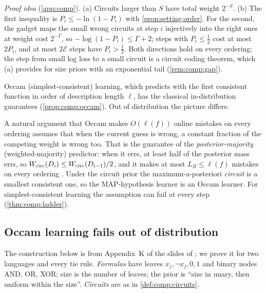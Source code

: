\emph{Proof idea} (\cref{app:comp}). (a) Circuits larger than $S$ have total weight $2^{-S}$. (b) The first inequality is $P_i\le-\ln(1-P_i)$ with \cref{prop:setting:order}. For the second, the gadget maps the small wrong circuits at step $i$ injectively into the right ones at weight cost $2^{-\Gamma}$, so $-\log(1-P_i)\le\Gamma+2$; steps with $P_i\le\frac12$ cost at most $2P_i$, and at most $2\mathcal E$ steps have $P_i>\frac12$. Both directions hold on every ordering; the step from small log loss to a small circuit is a circuit coding theorem, which (a) provides for size priors with an exponential tail (\cref{rem:comp:gap}).

Occam (simplest-consistent) learning, which predicts with the first consistent function in order of description length $\ell$, has the classical in-distribution guarantees (\cref{prop:comp:occam}). Out of distribution the picture differs:

\begin{remark}\label{rem:comp:majority}
A natural argument that Occam makes $O(\ell(f))$ online mistakes on every ordering assumes that when the current guess is wrong, a constant fraction of the competing weight is wrong too. That is the guarantee of the \emph{posterior-majority} (weighted-majority) predictor: when it errs, at least half of the posterior mass errs, so $W_{\mathrm{circ}}(D_i)\le W_{\mathrm{circ}}(D_{i-1})/2$, and it makes at most $L_B\le\ell(f)$ mistakes on every ordering \citep{littlestone1988learning,littlestone1994weighted}. Under the circuit prior the maximum-a-posteriori \emph{circuit} is a smallest consistent one, so the MAP-hypothesis learner is an Occam learner. For simplest-consistent learning the assumption can fail at every step (\cref{thm:comp:ladder}).
\end{remark}

\subsection{Occam learning fails out of distribution}\label{sec:comp:ladder}

The construction below is from Appendix~K of the slides of \citet{vaintrobhanni2026nnbayes}; we prove it for two languages and every tie rule. \emph{Formulas} have leaves $x_j,\neg x_j,0,1$ and binary nodes AND, OR, XOR; size is the number of leaves; the prior is ``size in unary, then uniform within the size''. \emph{Circuits} are as in \cref{def:comp:circuits}.

